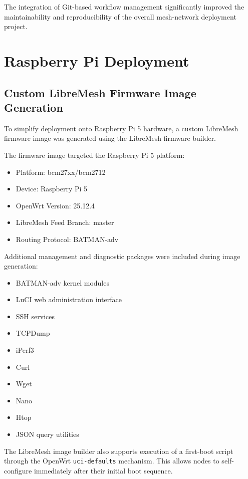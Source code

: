 \documentclass[conference]{IEEEtran}
\begin{document}
The integration of Git-based workflow management significantly improved the maintainability and reproducibility of the overall mesh-network deployment project.

\section{Raspberry Pi Deployment}

\subsection{Custom LibreMesh Firmware Image Generation}

To simplify deployment onto Raspberry Pi 5 hardware, a custom LibreMesh firmware image was generated using the LibreMesh firmware builder.

The firmware image targeted the Raspberry Pi 5 platform:

\begin{itemize}
    \item Platform: bcm27xx/bcm2712
    \item Device: Raspberry Pi 5
    \item OpenWrt Version: 25.12.4
    \item LibreMesh Feed Branch: master
    \item Routing Protocol: BATMAN-adv
\end{itemize}

Additional management and diagnostic packages were included during image generation:

\begin{itemize}
    \item BATMAN-adv kernel modules
    \item LuCI web administration interface
    \item SSH services
    \item TCPDump
    \item iPerf3
    \item Curl
    \item Wget
    \item Nano
    \item Htop
    \item JSON query utilities
\end{itemize}

The LibreMesh image builder also supports execution of a first-boot script through the OpenWrt \texttt{uci-defaults} mechanism. This allows nodes to self-configure immediately after their initial boot sequence.
\end{document}
